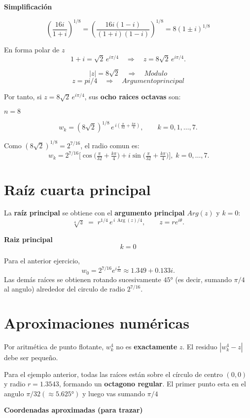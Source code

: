\documentclass[
  letterpaper,
  DIV=11,
  numbers=noendperiod]{scrreprt}
\begin{document}
\textbf{Simplificación}

\[
(\frac{16i}{1+i})^{1/8}
=(\frac{16i(1-i)}{(1+i)(1-i)})^{1/8}
=8(1±i)^{1/8}
\]

En forma polar de \(z\) \[
1+i=\sqrt2\,e^{i\pi/4}\quad\Rightarrow\quad
z=8\sqrt2\,e^{i\pi/4}.
\]

\[|z|=8\sqrt2\quad\Rightarrow\quad Modulo\]
\[z = pi/4\quad\Rightarrow\quad Argumento principal\]

Por tanto, si \(z=8\sqrt2\,e^{i\pi/4}\), sus \textbf{ocho raices
octavas} son:

\(n=8\)

\[
\boxed{w_k= (8\sqrt2)^{1/8}\,e^{\,i\left(\frac{\pi}{32}+\frac{k\pi}{4}\right)},
\qquad k=0,1,\dots,7.}
\]

Como \((8\sqrt2)^{1/8}=2^{7/16}\), el radio comun es: \[
\boxed{\,w_k=2^{7/16}\Big[\cos\!\Big(\tfrac{\pi}{32}+\tfrac{k\pi}{4}\Big)
+i\sin\!\Big(\tfrac{\pi}{32}+\tfrac{k\pi}{4}\Big)\Big],\;k=0,\ldots,7.}
\]

\section{Raíz cuarta principal}\label{rauxedz-cuarta-principal}

La \textbf{raíz principal} se obtiene con el \textbf{argumento
principal} \({Arg}(z)\) y \(k=0\): \[
\sqrt[4]{z}\;=\; r^{1/4}\,e^{\,i\,\operatorname{Arg}(z)/4}, \qquad z = r e^{i\theta}.
\]

\textbf{Raiz principal} \[k = 0\]

Para el anterior ejercicio, \[
w_0=2^{7/16}{e^{i\frac{\pi}{32}}}\approx 1.349+0.133i.
\] Las demás raíces se obtienen rotando sucesivamente \(45°\) (es decir,
sumando \({\pi/4}\) al angulo) alrededor del circulo de radio
\(2^{7/16}\).

\section{Aproximaciones numéricas}\label{aproximaciones-numuxe9ricas}

Por aritmética de punto flotante, \(w_k^4\) no es \textbf{exactamente}
\(z\). El residuo \(|w_k^4 - z|\) debe ser pequeño.

Para el ejemplo anterior, todas las raíces están sobre el círculo de
centro \((0,0)\) y radio \(r=1.3543\), formando un \textbf{octagono
regular}. El primer punto esta en el angulo
\({\pi}/32  (\approx 5.625°)\) y luego vas sumando \({\pi}/4\)

\textbf{Coordenadas aproximadas (para trazar)}
\end{document}
